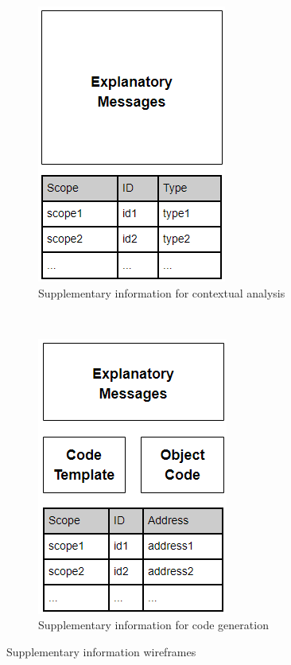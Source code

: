 \documentclass{l4proj}
\begin{document}
\begin{figure}[h]
	\centering
	\begin{subfigure}[b]{0.3\textwidth}
		\includegraphics[scale=0.7]{images/analytics-ca-wireframe.png}
		\caption{Supplementary information for contextual analysis}
		\label{fig:supp-info-ca}
	\end{subfigure}
	~
	\begin{subfigure}[b]{0.3\textwidth}
		\includegraphics[scale=0.7]{images/analytics-cg-wireframe.png}
		\caption{Supplementary information for code generation}
		\label{fig:supp-info-cg}
	\end{subfigure}	
	\caption{Supplementary information wireframes}
	\label{fig:supp-info-wireframe}	
\end{figure}
\end{document}
